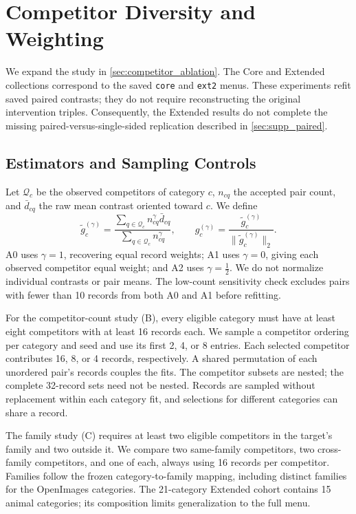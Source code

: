 \section{Competitor Diversity and Weighting}
\label{sec:supp_competitor}

We expand the study in \cref{sec:competitor_ablation}. The Core and
Extended collections correspond to the saved \texttt{core} and
\texttt{ext2} menus. These experiments refit saved paired contrasts;
they do not require reconstructing the original intervention triples.
Consequently, the Extended results do not complete the missing
paired-versus-single-sided replication described in
\cref{sec:supp_paired}.

\subsection{Estimators and Sampling Controls}

Let \(\mathcal Q_c\) be the observed competitors of category \(c\),
\(n_{cq}\) the accepted pair count, and \(\bar d_{cq}\) the raw
mean contrast oriented toward \(c\). We define
\begin{equation}
    \widetilde g_c^{(\gamma)}=
    \frac{\sum_{q\in\mathcal Q_c}n_{cq}^{\gamma}\bar d_{cq}}
         {\sum_{q\in\mathcal Q_c}n_{cq}^{\gamma}},
    \qquad
    g_c^{(\gamma)}=
    \frac{\widetilde g_c^{(\gamma)}}{\|\widetilde g_c^{(\gamma)}\|_2}.
    \label{eq:competitor_weighting}
\end{equation}
A0 uses \(\gamma=1\), recovering equal record weights; A1 uses
\(\gamma=0\), giving each observed competitor equal weight; and A2
uses \(\gamma=\tfrac12\). We do not normalize individual contrasts
or pair means. The low-count sensitivity check excludes pairs with fewer
than 10 records from both A0 and A1 before refitting.

For the competitor-count study (B), every eligible category must have
at least eight competitors with at least 16 records each. We sample a
competitor ordering per category and seed and use its first 2, 4, or 8
entries. Each selected competitor contributes 16, 8, or 4 records,
respectively. A shared permutation of each unordered pair's records
couples the fits. The competitor subsets are nested; the complete
32-record sets need not be nested. Records are sampled without replacement
within each category fit, and selections for different categories can
share a record.

The family study (C) requires at least two eligible competitors in the
target's family and two outside it. We compare two same-family
competitors, two cross-family competitors, and one of each, always using
16 records per competitor. Families follow the frozen category-to-family
mapping, including distinct families for the OpenImages categories.
The 21-category Extended cohort contains 15 animal categories; its
composition limits generalization to the full menu.

